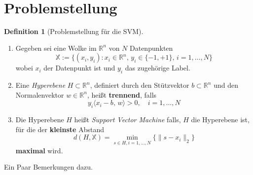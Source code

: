 \documentclass[
]{book}
\theoremstyle{definition}
\newtheorem{definition}{Definition}[chapter]
\theoremstyle{definition}
\theoremstyle{definition}
\theoremstyle{definition}
\theoremstyle{remark}
\begin{document}
\hypertarget{problemstellung}{%
\section{Problemstellung}\label{problemstellung}}

\begin{definition}[Problemstellung für die SVM]
\protect\hypertarget{def:def-svm-problem}{}\label{def:def-svm-problem}\leavevmode

\begin{enumerate}
\def\labelenumi{\arabic{enumi}.}
\item
  Gegeben sei eine Wolke im \(\mathbb R^{n}\) von \(N\) Datenpunkten \[\mathbb X :=
  \bigl \{(x_i,y_i)\colon x_i \in \mathbb R^{n}, \, y_i\in \{-1,+1\}, \,
  i=1,\dotsc, N\bigr \}\] wobei \(x_i\) der Datenpunkt ist und \(y_i\) das
  zugehörige Label.
\item
  Eine \emph{Hyperebene} \(H\subset \mathbb R^{n}\), definiert durch den
  Stützvektor \(b\subset \mathbb R^{n}\) und den Normalenvektor \(w\in \mathbb R^{n}\), heißt \textbf{trennend}, falls
  \begin{equation}\label{eq:eqn-trennende-hyperebene}
  y_i\bigl \langle x_i-b, \, w\bigr\rangle  >0, \quad i=1,\dotsc,N
  \end{equation}
\item
  Die Hyperebene \(H\) heißt \emph{Support Vector Machine} falls, \(H\) die
  Hyperebene ist, für die der \textbf{kleinste} Abstand
  \[d(H, \mathbb X) = \min_{s\in H, i=1, \dotsc, N}\{\|s-x_i\|_2\}\]
  \textbf{maximal} wird.
\end{enumerate}

\end{definition}

Ein Paar Bemerkungen dazu.
\end{document}
